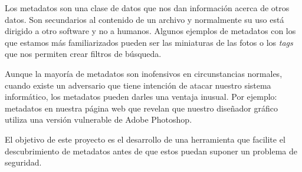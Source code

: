 Los metadatos son una clase de datos que nos dan información acerca de otros datos. Son secundarios al contenido de un archivo y normalmente su uso está dirigido a otro software y no a humanos. Algunos ejemplos de metadatos con los que estamos más familiarizados pueden ser las miniaturas de las fotos o los \textit{tags} que nos permiten crear filtros de búsqueda.

Aunque la mayoría de metadatos son inofensivos en circunstancias normales, cuando existe un adversario que tiene intención de atacar nuestro sistema informático, los metadatos pueden darles una ventaja inusual. Por ejemplo: metadatos en nuestra página web que revelan que nuestro diseñador gráfico utiliza una versión vulnerable de Adobe Photoshop.

El objetivo de este proyecto es el desarrollo de una herramienta que facilite el descubrimiento de metadatos antes de que estos puedan suponer un problema de seguridad.
